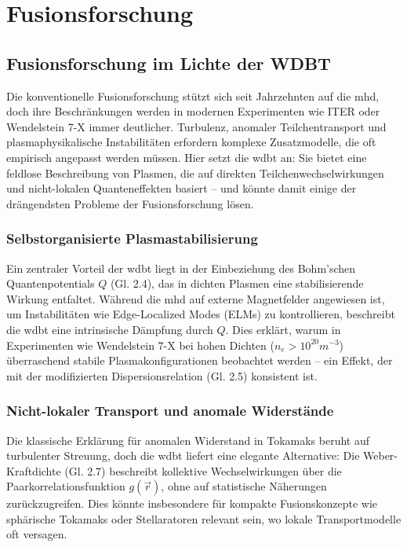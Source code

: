 \chapter{Fusionsforschung}
\section{Fusionsforschung im Lichte der WDBT}
Die konventionelle Fusionsforschung stützt sich seit Jahrzehnten auf die \gls{mhd}, doch ihre Beschränkungen werden in modernen Experimenten wie ITER oder Wendelstein 7-X immer
deutlicher. Turbulenz, anomaler Teilchentransport und plasmaphysikalische Instabilitäten erfordern komplexe Zusatzmodelle, die oft empirisch angepasst werden müssen. Hier setzt die
\gls{wdbt} an: Sie bietet eine feldlose Beschreibung von Plasmen, die auf direkten Teilchenwechselwirkungen und nicht-lokalen Quanteneffekten basiert – und könnte damit einige der
drängendsten Probleme der Fusionsforschung lösen.

\subsection{Selbstorganisierte Plasmastabilisierung}
Ein zentraler Vorteil der \gls{wdbt} liegt in der Einbeziehung des Bohm’schen Quantenpotentials $Q$ (Gl. 2.4), das in dichten Plasmen eine stabilisierende Wirkung entfaltet.
Während die \gls{mhd} auf externe Magnetfelder angewiesen ist, um Instabilitäten wie Edge-Localized Modes (ELMs) zu kontrollieren, beschreibt die \gls{wdbt} eine intrinsische
Dämpfung durch $Q$. Dies erklärt, warum in Experimenten wie Wendelstein 7-X bei hohen Dichten ($n_e > 10^{20} m^{-3}$) überraschend stabile Plasmakonfigurationen beobachtet
werden – ein Effekt, der mit der modifizierten Dispersionsrelation (Gl. 2.5) konsistent ist.

\subsection{Nicht-lokaler Transport und anomale Widerstände}
Die klassische Erklärung für anomalen Widerstand in Tokamaks beruht auf turbulenter Streuung, doch die \gls{wdbt} liefert eine elegante Alternative: Die Weber-Kraftdichte (Gl. 2.7)
beschreibt kollektive Wechselwirkungen über die Paarkorrelationsfunktion $g(\vec{r})$, ohne auf statistische Näherungen zurückzugreifen. Dies könnte insbesondere für kompakte
Fusionskonzepte wie sphärische Tokamaks oder Stellaratoren relevant sein, wo lokale Transportmodelle oft versagen.

